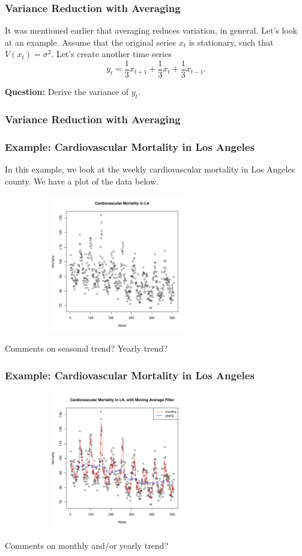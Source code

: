 \documentclass[%
xcolor=pdftex]{beamer}
\begin{document}
\begin{frame}
\frametitle{Variance Reduction with Averaging}

It was mentioned earlier that averaging reduces variation, in general. Let's look at an example. Assume that the original series $x_t$  is
stationary, such that $V(x_t) = \sigma^2$. Let's create another time series
$$
y_t=\frac{1}{3} x_{t+1}+\frac{1}{3} x_{t}+\frac{1}{3} x_{t-1}.
$$

\textbf{Question:} Derive the variance of $y_t$.

\end{frame}

\begin{frame}
\frametitle{Variance Reduction with Averaging}


\end{frame}

\begin{frame}
\frametitle{Example: Cardiovascular Mortality in Los Angeles}

In this example, we look at the weekly cardiovascular mortality in Los Angeles county. We have a plot of the data below.

\includegraphics[width=100mm, height=60mm]{mort.pdf}

Comments on seasonal trend? Yearly trend?

\end{frame}



\begin{frame}
\frametitle{Example: Cardiovascular Mortality in Los Angeles}

\includegraphics[width=100mm, height=60mm]{filter.pdf}

Comments on monthly and/or yearly trend?

\end{frame}
\end{document}
